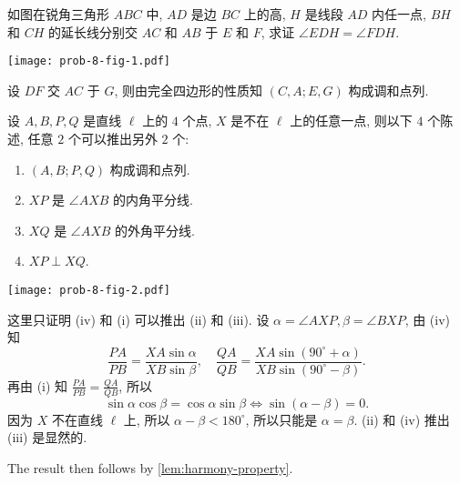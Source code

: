 \begin{prob}
\label{prob:prob-8}
如图在锐角三角形 $ABC$ 中, $AD$ 是边 $BC$ 上的高,
$H$ 是线段 $AD$ 内任一点, $BH$ 和 $CH$ 的延长线分别交
$AC$ 和 $AB$ 于 $E$ 和 $F$, 求证 $\angle EDH = \angle FDH$.
\end{prob}

\begin{center}
\texttt{[image: prob-8-fig-1.pdf]}
\end{center}

\begin{soln}
设 $DF$ 交 $AC$ 于 $G$, 则由完全四边形的性质知 $(C,A;E,G)$ 构成调和点列.

\begin{lem}[调和点列的性质]
\label{lem:harmony-property}
设 $A,B,P,Q$ 是直线 $\ell$ 上的 $4$ 个点,
$X$ 是不在 $\ell$ 上的任意一点,
则以下 $4$ 个陈述, 任意 $2$ 个可以推出另外 $2$ 个:
\begin{enumerate}[label=\normalfont(\roman*)]
\item $(A,B;P,Q)$ 构成调和点列.
\item $XP$ 是 $\angle AXB$ 的内角平分线.
\item $XQ$ 是 $\angle AXB$ 的外角平分线.
\item $XP \perp XQ$.
\end{enumerate}
\end{lem}

\begin{center}
\texttt{[image: prob-8-fig-2.pdf]}
\end{center}

\begin{subproof}
这里只证明 (iv) 和 (i) 可以推出 (ii) 和 (iii).
设 $\alpha = \angle AXP, \beta=\angle BXP$, 由 (iv) 知
\begin{equation}
\label{eq11}
\frac{PA}{PB} = \frac{XA\sin\alpha}{XB\sin\beta}, \quad
\frac{QA}{QB} = \frac{XA\sin(90^\circ + \alpha)}{XB\sin(90^\circ - \beta)}.
\end{equation}
再由 (i) 知 $\frac{PA}{PB} = \frac{QA}{QB}$, 所以
\[
\sin\alpha\cos\beta=\cos\alpha\sin\beta \iff \sin(\alpha-\beta) = 0.
\]
因为 $X$ 不在直线 $\ell$ 上, 所以 $\alpha - \beta < 180^\circ$,
所以只能是 $\alpha = \beta$.
(ii) 和 (iv) 推出 (iii) 是显然的.
\end{subproof}

The result then follows by \cref{lem:harmony-property}.
\end{soln}
